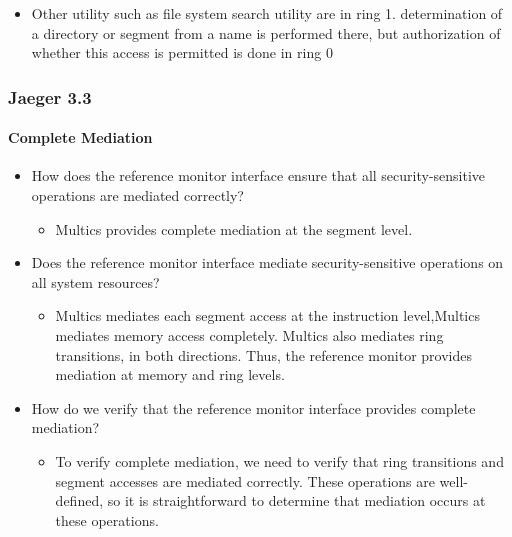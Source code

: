 \documentclass[
  12pt]{findlay}
\providecommand{\tightlist}{%
  \setlength{\itemsep}{0pt}\setlength{\parskip}{0pt}}
\begin{document}
\begin{itemize}
  \begin{itemize}
  \tightlist
  \item
    Other utility such as file system search utility are in ring 1.
    determination of a directory or segment from a name is performed
    there, but authorization of whether this access is permitted is done
    in ring 0
  \end{itemize}
\end{itemize}

\hypertarget{jaeger-3.3}{%
\subsubsection{Jaeger 3.3}\label{jaeger-3.3}}

\hypertarget{complete-mediation-1}{%
\paragraph{Complete Mediation}\label{complete-mediation-1}}

\begin{itemize}
\tightlist
\item
  How does the reference monitor interface ensure that all
  security-sensitive operations are mediated correctly?

  \begin{itemize}
  \tightlist
  \item
    Multics provides complete mediation at the segment level.
  \end{itemize}
\item
  Does the reference monitor interface mediate security-sensitive
  operations on all system resources?

  \begin{itemize}
  \tightlist
  \item
    Multics mediates each segment access at the instruction
    level,Multics mediates memory access completely. Multics also
    mediates ring transitions, in both directions. Thus, the reference
    monitor provides mediation at memory and ring levels.
  \end{itemize}
\item
  How do we verify that the reference monitor interface provides
  complete mediation?

  \begin{itemize}
  \tightlist
  \item
    To verify complete mediation, we need to verify that ring
    transitions and segment accesses are mediated correctly. These
    operations are well-defined, so it is straightforward to determine
    that mediation occurs at these operations.
  \end{itemize}
\end{itemize}
\end{document}
